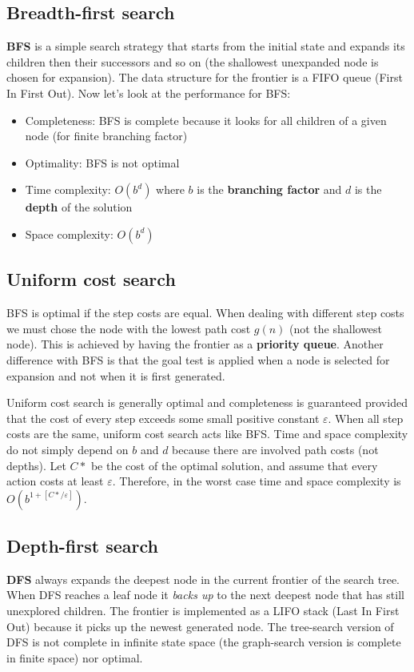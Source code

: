 \documentclass[a4paper, 11pt]{article}
\begin{document}
\subsection*{Breadth-first search}
\textbf{BFS} is a simple search strategy that starts from the initial state and expands its children then their successors and so on (the shallowest unexpanded node is chosen for expansion). The data structure for the frontier is a FIFO queue (First In First Out). Now let's look at the performance for BFS:
\begin{itemize}
  \item Completeness: BFS is complete because it looks for all children of a given node (for finite branching factor)
  \item Optimality: BFS is not optimal
  \item Time complexity: $O(b^d)$ where $b$ is the \textbf{branching factor} and $d$ is the \textbf{depth} of the solution
  \item Space complexity: $O(b^d)$
\end{itemize}

\subsection*{Uniform cost search}
BFS is optimal if the step costs are equal. When dealing with different step costs we must chose the node with the lowest path cost $g(n)$ (not the shallowest node). This is achieved by having the frontier as a \textbf{priority queue}. Another difference with BFS is that the goal test is applied when a node is selected for expansion and not when it is first generated.

Uniform cost search is generally optimal and completeness is guaranteed provided that the cost of every step exceeds some small positive constant $\varepsilon$.
When all step costs are the same, uniform cost search acts like BFS. Time and space complexity do not simply depend on $b$ and $d$ because there are involved path costs (not depths). Let $C*$ be the cost of the optimal solution, and assume that every action costs at least $\varepsilon$. Therefore, in the worst case time and space complexity is $O(b^{1+ [C*/\varepsilon]})$.

\subsection*{Depth-first search}
\textbf{DFS} always expands the deepest node in the current frontier of the search tree. When DFS reaches a leaf node it \emph{backs up} to the next deepest node that has still unexplored children. The frontier is implemented as a LIFO stack (Last In First Out) because it picks up the newest generated node.
The tree-search version of DFS is not complete in infinite state space (the graph-search version is complete in finite space) nor optimal.
\end{document}
